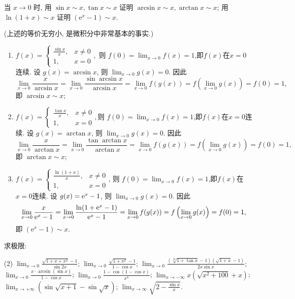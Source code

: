 \begin{exercise}[2.1.16]
    当 $x \to 0$ 时, 用 $\sin x \sim x, \tan x \sim x$ 证明 $\arcsin x \sim x, \arctan x \sim x$; 用 $\ln(1+x) \sim x$ 证明 $(\mathrm{e}^x-1) \sim x$.

    (上述的等价无穷小, 是微积分中非常基本的事实.)
\end{exercise}

\begin{solution}
    \begin{enumerate}
        \item $f(x) = \begin{cases}
            \frac{\sin x}{x},&x\neq 0\\
            1,&x=0
        \end{cases},$ 则 $f(0)=\lim_{x \to 0} f(x) = 1$,即$f(x)$在$x=0$连续.
        设 $g(x) = \arcsin x$, 则 $\lim_{x \to 0} g(x) = 0$. 
        因此$$\lim_{x \to 0} \frac{x}{\arcsin x } = \lim_{x \to 0} \frac{\sin  \arcsin x}{\arcsin x }= \lim_{x \to 0} f(g(x)) = f \left( \lim_{x \to 0} g(x) \right) = f(0) = 1,$$ 
        即 $\arcsin x \sim x$;
        \item $f(x) = \begin{cases}
            \frac{\tan x}{x},&x\neq 0\\
            1,&x=0
        \end{cases},$则 $f(0)=\lim_{x \to 0} f(x) = 1$,即$f(x)$在$x=0$连续.
        设 $g(x) = \arctan x$, 则 $\lim_{x \to 0} g(x) = 0$.
         因此$$\lim_{x \to 0} \frac{x}{\arctan x} = \lim_{x \to 0} \frac{\tan \arctan x}{\arctan x}=\lim_{x \to 0} f(g(x)) = f \left( \lim_{x \to 0} g(x) \right) = f(0) = 1,$$
         即 $\arctan x \sim x$;
        \item $f(x) = \begin{cases}
            \frac{\ln(1+x)}{x},&x\neq 0\\
            1,&x=0
        \end{cases}$, 则 $f(0)=\lim_{x \to 0} f(x) = 1$,即$f(x)$在$x=0$连续.
         设 $g(x) = \mathrm{e}^x - 1$, 则 $\lim_{x \to 0} g(x) = 0$.
        因此$$\lim_{x \to 0} \frac{x}{\mathrm{e}^x-1}=\lim_{x \to 0} \frac{\ln(1+\mathrm{e}^{x}-1)}{\mathrm{e}^x-1} = \lim_{x \to 0} f(g(x)) = f \left( \lim_{x \to 0} g(x) \right) = f(0) = 1, $$即 $(\mathrm{e}^x - 1) \sim x$.
    \end{enumerate}
\end{solution}

\begin{exercise}[2.1.17]
    求极限:
    \begin{tasks}[label=(\arabic*)](2)
        \task $\lim_{x \to 0} \frac{\sqrt{1+x+x^2}-1}{\sin 2x}$;
        \task $\lim_{x \to 0} \frac{\sqrt{1+x^2}-1}{1-\cos x}$;
        \task $\lim_{x \to 0} \frac{(\sqrt[10]{1+\tan x}-1)(\sqrt{1+x}-1)}{2x\sin x}$;
        \task $\lim_{x \to 0} \frac{x \cdot \arcsin(\sin x)}{1-\cos x}$;
        \task $\lim_{x \to 0} \frac{1-\cos(1-\cos x)}{x^4}$;
        \task $\lim_{x \to -\infty} x(\sqrt{x^2+100}+x)$;
        \task $\lim_{x \to +\infty} (\sin\sqrt{x+1}-\sin\sqrt{x})$;
        \task $\lim_{x \to \infty} \sqrt{2-\frac{\sin x}{x}}$.
    \end{tasks}
\end{exercise}

